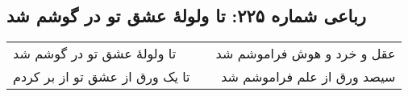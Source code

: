 \begin{center}
\section*{رباعی شماره ۲۲۵: تا ولولهٔ عشق تو در گوشم شد}
\label{sec:sh225}
\begin{longtable}{l p{0.5cm} r}
تا ولولهٔ عشق تو در گوشم شد
&&
عقل و خرد و هوش فراموشم شد
\\
تا یک ورق از عشق تو از بر کردم
&&
سیصد ورق از علم فراموشم شد
\\
\end{longtable}
\end{center}
